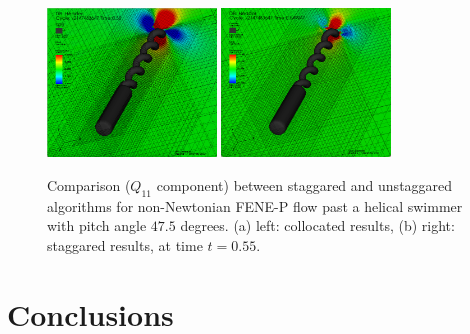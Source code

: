 \documentclass[]{article}
\begin{document}
\begin{figure}[htpb]
\centering
\includegraphics[width=0.4\textwidth]{collocated_47p5.png}
\includegraphics[width=0.4\textwidth]{staggared_47p5.png}
\caption{Comparison ($Q_{11}$ component) between staggared and 
    	unstaggared algorithms for 
        non-Newtonian FENE-P flow past a helical swimmer with pitch angle
        $47.5$ degrees.
	(a) left: collocated results, (b) right: staggared results,
	at time $t=0.55$. \label{helix47p5} }
\end{figure}

\section{Conclusions} 


\newpage


\end{document}
